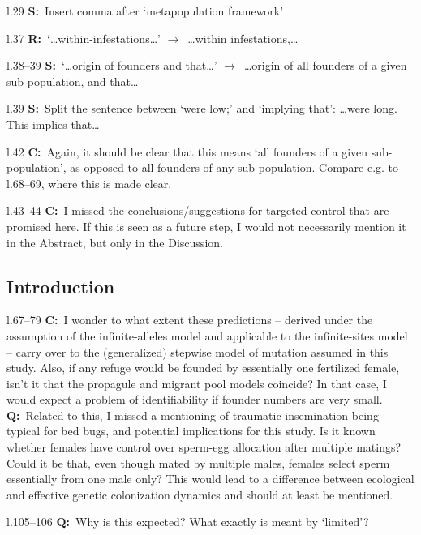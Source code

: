 \documentclass[11pt]{article}
\newenvironment{my_description}
{\begin{description}
  \setlength{\itemsep}{2pt}
  \setlength{\parskip}{0pt}
  \setlength{\parsep}{0pt}}
{\end{description}}
\newcommand{\ra}{$\rightarrow$\ }
\newcommand{\C}{\textbf{C:}\ }
\newcommand{\Q}{\textbf{Q:}\ }
\newcommand{\R}{\textbf{R:}\ }
\newcommand{\V}{\textbf{S:}\ }
\begin{document}
\begin{my_description}
	\item[l.29] \V Insert comma after `metapopulation framework'
	\item[l.37] \R `\dots within-infestations\dots' \ra \dots within infestations,\dots
	\item[l.38--39] \V `\dots origin of founders and that\dots' \ra \dots origin of all founders of a given sub-population, and that\dots
	\item[l.39] \V Split the sentence between `were low;' and `implying that': \dots were long. This implies that\dots
	\item[l.42] \C Again, it should be clear that this means `all founders of a given sub-population', as opposed to all founders of any sub-population. Compare e.g. to l.68--69, where this is made clear.
	\item[l.43--44] \C I missed the conclusions/suggestions for targeted control that are promised here. If this is seen as a future step, I would not necessarily mention it in the Abstract, but only in the Discussion.
\end{my_description}

\subsection{Introduction}
\begin{my_description}
	\item[l.67--79] \C I wonder to what extent these predictions -- derived under the assumption of the infinite-alleles model and applicable to the infinite-sites model -- carry over to the (generalized) stepwise model of mutation assumed in this study. Also, if any refuge would be founded by essentially one fertilized female, isn't it that the propagule and migrant pool models coincide? In that case, I would expect a problem of identifiability if founder numbers are very small. \Q Related to this, I missed a mentioning of traumatic insemination being typical for bed bugs, and potential implications for this study. Is it known whether females have control over sperm-egg allocation after multiple matings? Could it be that, even though mated by multiple males, females select sperm essentially from one male only? This would lead to a difference between ecological and effective genetic colonization dynamics and should at least be mentioned.
	\item[l.105--106] \Q Why is this expected? What exactly is meant by `limited'?
\end{my_description}
\end{document}
